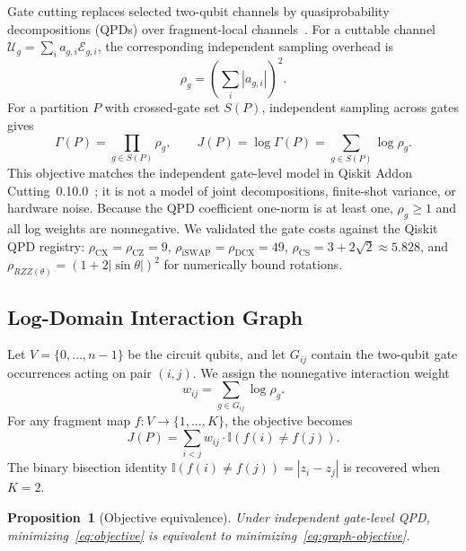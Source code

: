 \documentclass[11pt]{article}
\begin{document}
Gate cutting replaces selected two-qubit channels by quasiprobability decompositions (QPDs) over fragment-local channels~\cite{peng2020,mitarai2021}. For a cuttable channel $\mathcal{U}_g=\sum_i a_{g,i}\mathcal{E}_{g,i}$, the corresponding independent sampling overhead is
\begin{equation}
  \rho_g = \left(\sum_i |a_{g,i}|\right)^{\!2}.
  \label{eq:gate-overhead}
\end{equation}
For a partition $P$ with crossed-gate set $S(P)$, independent sampling across gates gives
\begin{equation}
  \Gamma(P) = \prod_{g \in S(P)} \rho_g, \qquad
  J(P) = \log \Gamma(P) = \sum_{g \in S(P)} \log \rho_g.
  \label{eq:objective}
\end{equation}
This objective matches the independent gate-level model in Qiskit Addon Cutting~0.10.0~\cite{qiskitcutting}; it is not a model of joint decompositions, finite-shot variance, or hardware noise. Because the QPD coefficient one-norm is at least one, $\rho_g\geq1$ and all log weights are nonnegative. We validated the gate costs against the Qiskit QPD registry: $\rho_{\mathrm{CX}}=\rho_{\mathrm{CZ}}=9$, $\rho_{\mathrm{iSWAP}}=\rho_{\mathrm{DCX}}=49$, $\rho_{\mathrm{CS}}=3+2\sqrt{2}\approx5.828$, and $\rho_{RZZ(\theta)}=(1+2|\sin\theta|)^2$ for numerically bound rotations.

\subsection{Log-Domain Interaction Graph}

Let $V=\{0,\ldots,n{-}1\}$ be the circuit qubits, and let $G_{ij}$ contain the two-qubit gate occurrences acting on pair $(i,j)$. We assign the nonnegative interaction weight
\begin{equation}
  w_{ij} = \sum_{g \in G_{ij}} \log \rho_g.
  \label{eq:weight}
\end{equation}
For any fragment map $f:V\rightarrow\{1,\ldots,K\}$, the objective becomes
\begin{equation}
  J(P) = \sum_{i < j} w_{ij} \cdot \mathbb{I}(f(i)\neq f(j)).
  \label{eq:graph-objective}
\end{equation}
The binary bisection identity $\mathbb{I}(f(i)\neq f(j))=|z_i-z_j|$ is recovered when $K=2$.

\textbf{Proposition~1} (Objective equivalence). \textit{Under independent gate-level QPD, minimizing~\eqref{eq:objective} is equivalent to minimizing~\eqref{eq:graph-objective}.}
\end{document}
